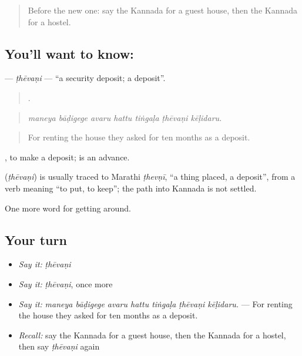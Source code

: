\label{lesson:KA-C461-thevani}



\begin{quote}
Before the new one: say the Kannada for a guest house, then the Kannada for a hostel.
\end{quote}

\subsection*{You'll want to know: }
\textbf{} — \emph{ṭhēvaṇi} — \textquotedblleft{}a security deposit; a deposit\textquotedblright{}.

\begin{quote}
      .
\end{quote}

\begin{quote}
\emph{maneya bāḍigege avaru hattu tiṅgaḷa ṭhēvaṇi kēḷidaru.}
\end{quote}

\begin{quote}
For renting the house they asked for ten months as a deposit.
\end{quote}

 , to make a deposit;  is an advance.

\begin{cousinweb}
\textbf{} (\emph{ṭhēvaṇi}) is usually traced to Marathi \emph{ṭhevṇī}, \textquotedblleft{}a thing placed, a deposit\textquotedblright{}, from a verb meaning \textquotedblleft{}to put, to keep\textquotedblright{}; the path into Kannada is not settled.
\end{cousinweb}

\begin{grammarlens}[title={What you've built}]
One more word for getting around.
\end{grammarlens}

\subsection*{Your turn}
\begin{itemize}
\raggedright
  \item \emph{Say it:} \emph{ṭhēvaṇi}
  \item \emph{Say it:} \emph{ṭhēvaṇi}, once more
  \item \emph{Say it:} \emph{maneya bāḍigege avaru hattu tiṅgaḷa ṭhēvaṇi kēḷidaru.} — For renting the house they asked for ten months as a deposit.
  \item \emph{Recall:} say the Kannada for a guest house, then the Kannada for a hostel, then say \emph{ṭhēvaṇi} again
\end{itemize}

